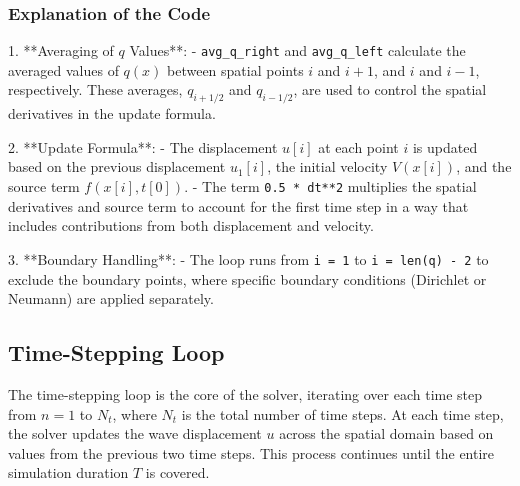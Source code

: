 \documentclass{article}
\begin{document}
		\subsubsection{Explanation of the Code}
		
		1. **Averaging of \( q \) Values**: 
		- \texttt{avg\_q\_right} and \texttt{avg\_q\_left} calculate the averaged values of \( q(x) \) between spatial points \( i \) and \( i+1 \), and \( i \) and \( i-1 \), respectively. These averages, \( q_{i+1/2} \) and \( q_{i-1/2} \), are used to control the spatial derivatives in the update formula.
		
		2. **Update Formula**: 
		- The displacement \( u[i] \) at each point \( i \) is updated based on the previous displacement \( u_1[i] \), the initial velocity \( V(x[i]) \), and the source term \( f(x[i], t[0]) \).
		- The term \texttt{0.5 * dt**2} multiplies the spatial derivatives and source term to account for the first time step in a way that includes contributions from both displacement and velocity.
		
		3. **Boundary Handling**: 
		- The loop runs from \texttt{i = 1} to \texttt{i = len(q) - 2} to exclude the boundary points, where specific boundary conditions (Dirichlet or Neumann) are applied separately.
		
		\begin{comment}
		
		\subsubsection{Importance of the First Time Step Calculation}
		
		In the finite difference method for solving wave equations, the first time step calculation is crucial as it sets up the initial movement of the wave. Including the velocity \( V(x) \) ensures that the initial kinetic energy is represented in the wave propagation. The averaged values of \( q \) minimize oscillations in regions where wave speed changes, promoting stability and accuracy in the overall solution.
		
		\end{comment}
		
		\subsection{Time-Stepping Loop}
		
		The time-stepping loop is the core of the solver, iterating over each time step from \( n = 1 \) to \( N_t \), where \( N_t \) is the total number of time steps. At each time step, the solver updates the wave displacement \( u \) across the spatial domain based on values from the previous two time steps. This process continues until the entire simulation duration \( T \) is covered.
		
\end{document}
